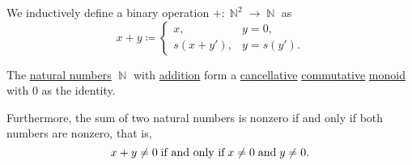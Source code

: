 \begin{definition}\label{def:natural_number_addition}
  We inductively define a binary  operation \( +: \BbbN^2 \to \BbbN \) as
  \begin{equation}\label{eq:def:natural_number_addition}
    x + y \coloneqq \begin{cases}
      x,         &y = 0,     \\
      s(x + y'), &y = s(y').
    \end{cases}
  \end{equation}
\end{definition}

\begin{proposition}\label{thm:natural_numbers_form_monoid_under_addition}
  The \hyperref[def:set_of_natural_numbers]{natural numbers} \( \BbbN \) with \hyperref[def:natural_number_addition]{addition} form a \hyperref[def:magma/cancellative]{cancellative} \hyperref[def:magma/commutative]{commutative} \hyperref[def:unital_magma/associative]{monoid} with \( 0 \) as the identity.

  Furthermore, the sum of two natural numbers is nonzero if and only if both numbers are nonzero, that is,
  \begin{equation}\label{eq:thm:natural_numbers_form_monoid_under_addition/nonzero_sum}
    x + y \neq 0 \T{if and only if} x \neq 0 \T{and} y \neq 0.
  \end{equation}
\end{proposition}
